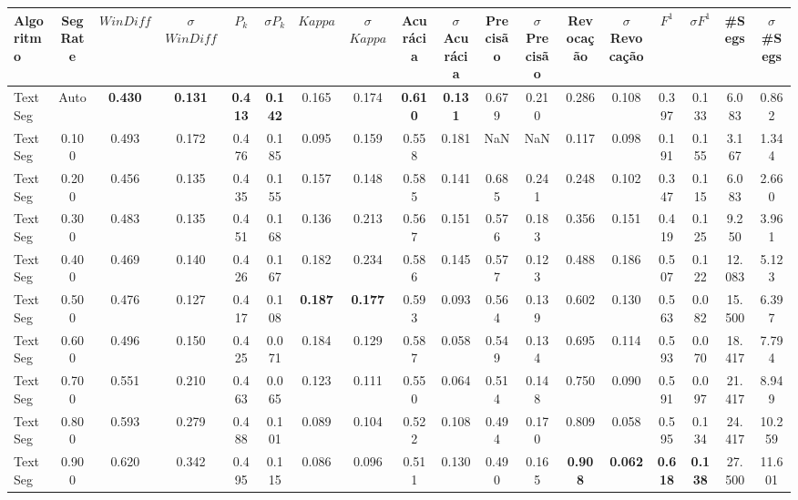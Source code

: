 \documentclass{article}
\begin{document}
\tiny\begin{longtable}[c]{|l|c|c|c|c|c|c|c|c|c|c|c|c|c|c|c|c|c|} 
\hline 
Algoritmo & Seg Rate & $WinDiff$ & $\sigma$$WinDiff$ & $P_k$ & $\sigma$$P_k$ & $Kappa$ & $\sigma$$Kappa$ & Acurácia & $\sigma$Acurácia & Precisão & $\sigma$Precisão & Revocação & $\sigma$Revocação & $F^1$ & $\sigma$$F^1$ & \#Segs & $\sigma$\#Segs\\ \hline 
TextSeg & Auto & \cellcolor{gray!20} \textbf{0.430} & \cellcolor{gray!20} \textbf{0.131} & \cellcolor{gray!20} \textbf{0.413} & \cellcolor{gray!20} \textbf{0.142} & 0.165 & 0.174 & \cellcolor{gray!20} \textbf{0.610} & \cellcolor{gray!20} \textbf{0.131} & 0.679 & 0.210 & 0.286 & 0.108 & 0.397 & 0.133 & 6.083 & 0.862  \\ \hline 
 TextSeg & 0.100 & 0.493 & 0.172 & 0.476 & 0.185 & 0.095 & 0.159 & 0.558 & 0.181 & NaN & NaN & 0.117 & 0.098 & 0.191 & 0.155 & 3.167 & 1.344  \\ \hline 
 TextSeg & 0.200 & 0.456 & 0.135 & 0.435 & 0.155 & 0.157 & 0.148 & 0.585 & 0.141 & 0.685 & 0.241 & 0.248 & 0.102 & 0.347 & 0.115 & 6.083 & 2.660  \\ \hline 
 TextSeg & 0.300 & 0.483 & 0.135 & 0.451 & 0.168 & 0.136 & 0.213 & 0.567 & 0.151 & 0.576 & 0.183 & 0.356 & 0.151 & 0.419 & 0.125 & 9.250 & 3.961  \\ \hline 
 TextSeg & 0.400 & 0.469 & 0.140 & 0.426 & 0.167 & 0.182 & 0.234 & 0.586 & 0.145 & 0.577 & 0.123 & 0.488 & 0.186 & 0.507 & 0.122 & 12.083 & 5.123  \\ \hline 
 TextSeg & 0.500 & 0.476 & 0.127 & 0.417 & 0.108 & \cellcolor{gray!20} \textbf{0.187} & \cellcolor{gray!20} \textbf{0.177} & 0.593 & 0.093 & 0.564 & 0.139 & 0.602 & 0.130 & 0.563 & 0.082 & 15.500 & 6.397  \\ \hline 
 TextSeg & 0.600 & 0.496 & 0.150 & 0.425 & 0.071 & 0.184 & 0.129 & 0.587 & 0.058 & 0.549 & 0.134 & 0.695 & 0.114 & 0.593 & 0.070 & 18.417 & 7.794  \\ \hline 
 TextSeg & 0.700 & 0.551 & 0.210 & 0.463 & 0.065 & 0.123 & 0.111 & 0.550 & 0.064 & 0.514 & 0.148 & 0.750 & 0.090 & 0.591 & 0.097 & 21.417 & 8.949  \\ \hline 
 TextSeg & 0.800 & 0.593 & 0.279 & 0.488 & 0.101 & 0.089 & 0.104 & 0.522 & 0.108 & 0.494 & 0.170 & 0.809 & 0.058 & 0.595 & 0.134 & 24.417 & 10.259  \\ \hline 
 TextSeg & 0.900 & 0.620 & 0.342 & 0.495 & 0.115 & 0.086 & 0.096 & 0.511 & 0.130 & 0.490 & 0.165 & \cellcolor{gray!20} \textbf{0.908} & \cellcolor{gray!20} \textbf{0.062} & \cellcolor{gray!20} \textbf{0.618} & \cellcolor{gray!20} \textbf{0.138} & 27.500 & 11.601  \\ \hline 
 \end{longtable} 
\end{document}
